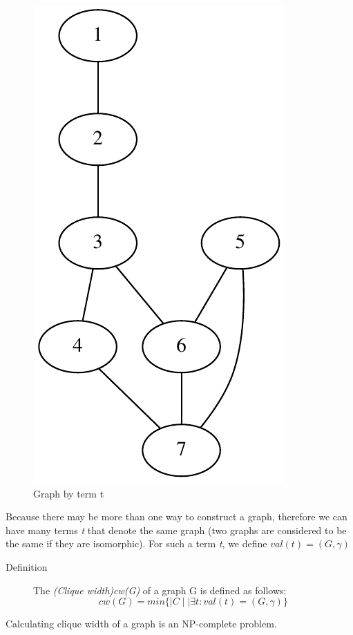 \documentclass[a4paper, 12pt]{article}
\begin{document}
\begin{figure}[H]
\centering{}
\includegraphics[scale=0.5]{image/graph_by_t}
\caption{Graph by term t}
\end{figure}
Because there may be more than one way to construct a graph, therefore we can have many terms \textit {t }that denote the same graph (two graphs are considered to be the same if they are isomorphic). For such a term \textit {t}, we define \textit {$val(t)=(G,\gamma)$} 

\begin{description}
\item [{Definition}] \cite {vadim-lozin}The \textit {(Clique width)}\textit {cw(G)} of a graph G  is defined as follows: 
\[
cw(G)=min\{\mid C\mid\mid\exists t:val(t)=(G,\gamma)\}
\]
\end{description}
Calculating clique width of a graph is an NP-complete problem.

\end{document}
